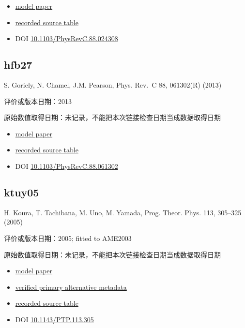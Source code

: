 \documentclass[
  11pt,
  letterpaper,
]{article}
\providecommand{\tightlist}{%
  \setlength{\itemsep}{0pt}\setlength{\parskip}{0pt}}
\begin{document}
\begin{itemize}
\tightlist
\item
  \href{https://doi.org/10.1103/PhysRevC.88.024308}{model paper}
\item
  \href{https://www.astro.ulb.ac.be/bruslib/nucdata/hfb26-dat}{recorded
  source table}
\item
  DOI
  \href{https://doi.org/10.1103/PhysRevC.88.024308}{10.1103/PhysRevC.88.024308}
\end{itemize}

\subsection{hfb27}\label{hfb27}

S. Goriely, N. Chamel, J.M. Pearson, Phys. Rev.~C 88, 061302(R) (2013)

评价或版本日期：2013

原始数值取得日期：未记录，不能把本次链接检查日期当成数据取得日期

\begin{itemize}
\tightlist
\item
  \href{https://doi.org/10.1103/PhysRevC.88.061302}{model paper}
\item
  \href{https://www.astro.ulb.ac.be/bruslib/nucdata/hfb27-dat}{recorded
  source table}
\item
  DOI
  \href{https://doi.org/10.1103/PhysRevC.88.061302}{10.1103/PhysRevC.88.061302}
\end{itemize}

\subsection{ktuy05}\label{ktuy05}

H. Koura, T. Tachibana, M. Uno, M. Yamada, Prog. Theor. Phys. 113,
305--325 (2005)

评价或版本日期：2005; fitted to AME2003

原始数值取得日期：未记录，不能把本次链接检查日期当成数据取得日期

\begin{itemize}
\tightlist
\item
  \href{https://doi.org/10.1143/PTP.113.305}{model paper}
\item
  \href{https://academic.oup.com/ptp/issue/113/2}{verified primary
  alternative metadata}
\item
  \href{https://wwwndc.jaea.go.jp/nucldata/mass/KTUY05_m246.dat}{recorded
  source table}
\item
  DOI \href{https://doi.org/10.1143/PTP.113.305}{10.1143/PTP.113.305}
\end{itemize}
\end{document}
